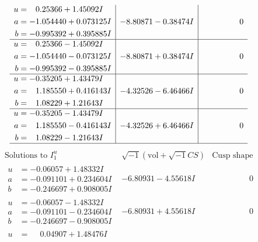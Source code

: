 \documentclass[1p]{elsarticle_modified}
\theoremstyle{definition}
\newcommand{\I}{\sqrt{-1}}
\begin{document}
$$\begin{array}{c|c|c}
\begin{aligned}
u &= \phantom{-}0.25366 + 1.45092 I \\
a &= -1.054440 + 0.073125 I \\
b &= -0.995392 + 0.395885 I\end{aligned}
 & -8.80871 - 0.38474 I & \phantom{-0.000000 } 0 \\ \hline\begin{aligned}
u &= \phantom{-}0.25366 - 1.45092 I \\
a &= -1.054440 - 0.073125 I \\
b &= -0.995392 - 0.395885 I\end{aligned}
 & -8.80871 + 0.38474 I & \phantom{-0.000000 } 0 \\ \hline\begin{aligned}
u &= -0.35205 + 1.43479 I \\
a &= \phantom{-}1.185550 + 0.416143 I \\
b &= \phantom{-}1.08229 + 1.21643 I\end{aligned}
 & -4.32526 - 6.46466 I & \phantom{-0.000000 } 0 \\ \hline\begin{aligned}
u &= -0.35205 - 1.43479 I \\
a &= \phantom{-}1.185550 - 0.416143 I \\
b &= \phantom{-}1.08229 - 1.21643 I\end{aligned}
 & -4.32526 + 6.46466 I & \phantom{-0.000000 } 0\\
 \hline 
 \end{array}$$\newpage$$\begin{array}{c|c|c}  
\text{Solutions to }I^u_{1}& \I (\text{vol} + \sqrt{-1}CS) & \text{Cusp shape}\\
 \hline 
\begin{aligned}
u &= -0.06057 + 1.48332 I \\
a &= -0.091101 + 0.234604 I \\
b &= -0.246697 + 0.908005 I\end{aligned}
 & -6.80931 - 4.55618 I & \phantom{-0.000000 } 0 \\ \hline\begin{aligned}
u &= -0.06057 - 1.48332 I \\
a &= -0.091101 - 0.234604 I \\
b &= -0.246697 - 0.908005 I\end{aligned}
 & -6.80931 + 4.55618 I & \phantom{-0.000000 } 0 \\ \hline\begin{aligned}
u &= \phantom{-}0.04907 + 1.48476 I \\

\end{aligned}
\end{array}$$
\end{document}
